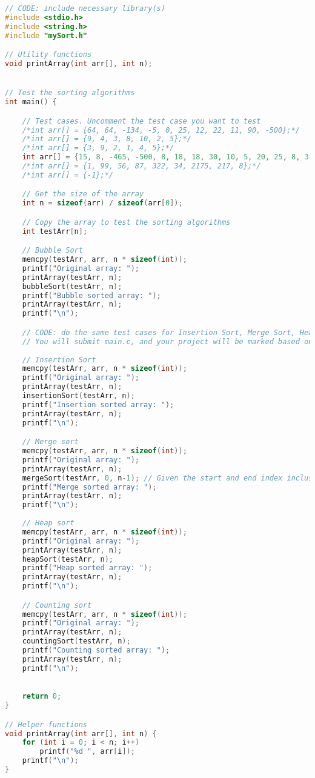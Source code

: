 \documentclass[12pt]{article}
\begin{document}
\begin{lstlisting}[language=c]
// CODE: include necessary library(s)
#include <stdio.h>
#include <string.h>
#include "mySort.h"

// Utility functions
void printArray(int arr[], int n);


// Test the sorting algorithms
int main() {

	// Test cases. Uncomment the test case you want to test
    /*int arr[] = {64, 64, -134, -5, 0, 25, 12, 22, 11, 90, -500};*/
	/*int arr[] = {9, 4, 3, 8, 10, 2, 5};*/
	/*int arr[] = {3, 9, 2, 1, 4, 5};*/
	int arr[] = {15, 8, -465, -500, 8, 18, 18, 30, 10, 5, 20, 25, 8, 3, 2, 18, 6, -28, -40, -465};
	/*int arr[] = {1, 99, 56, 87, 322, 34, 2175, 217, 8};*/
	/*int arr[] = {-1};*/

	// Get the size of the array
	int n = sizeof(arr) / sizeof(arr[0]);

	// Copy the array to test the sorting algorithms
	int testArr[n];

	// Bubble Sort
	memcpy(testArr, arr, n * sizeof(int));
	printf("Original array: ");
    printArray(testArr, n);
    bubbleSort(testArr, n);
    printf("Bubble sorted array: ");
    printArray(testArr, n);
	printf("\n");

    // CODE: do the same test cases for Insertion Sort, Merge Sort, Heap Sort, Counting Sort
    // You will submit main.c, and your project will be marked based on main.c as well
	
    // Insertion Sort
	memcpy(testArr, arr, n * sizeof(int));
	printf("Original array: ");
	printArray(testArr, n);
	insertionSort(testArr, n);
	printf("Insertion sorted array: ");
	printArray(testArr, n);
	printf("\n");

	// Merge sort
	memcpy(testArr, arr, n * sizeof(int));
	printf("Original array: ");
	printArray(testArr, n);
	mergeSort(testArr, 0, n-1); // Given the start and end index inclusive
	printf("Merge sorted array: ");
	printArray(testArr, n);
	printf("\n");
    
	// Heap sort
	memcpy(testArr, arr, n * sizeof(int));
	printf("Original array: ");
	printArray(testArr, n);
	heapSort(testArr, n);
	printf("Heap sorted array: ");
	printArray(testArr, n);
	printf("\n");

	// Counting sort
	memcpy(testArr, arr, n * sizeof(int));
	printf("Original array: ");
	printArray(testArr, n);
	countingSort(testArr, n);
	printf("Counting sorted array: ");
	printArray(testArr, n);
	printf("\n");
	

    return 0;
}

// Helper functions
void printArray(int arr[], int n) {
    for (int i = 0; i < n; i++)
        printf("%d ", arr[i]);
    printf("\n");
}

\end{lstlisting}
\end{document}
